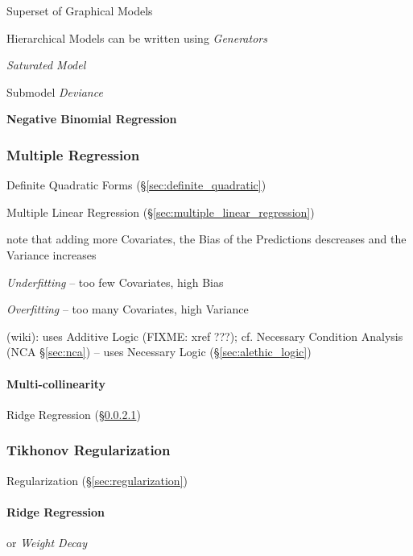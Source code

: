 Superset of Graphical Models

Hierarchical Models can be written using \emph{Generators}

\emph{Saturated Model}

Submodel \emph{Deviance}

\textbf{Negative Binomial Regression}



\subsubsection{Multiple Regression}\label{sec:multiple_regression}

Definite Quadratic Forms (\S\ref{sec:definite_quadratic})

Multiple Linear Regression (\S\ref{sec:multiple_linear_regression})

note that adding more Covariates, the Bias of the Predictions descreases and the
Variance increases

\emph{Underfitting} -- too few Covariates, high Bias

\emph{Overfitting} -- too many Covariates, high Variance

(wiki): uses Additive Logic (FIXME: xref ???); cf. Necessary Condition Analysis
(NCA \S\ref{sec:nca}) -- uses Necessary Logic (\S\ref{sec:alethic_logic})



\paragraph{Multi-collinearity}\label{sec:multicollinearity}\hfill

Ridge Regression (\S\ref{sec:ridge_regression})



\subsubsection{Tikhonov Regularization}\label{sec:tikhonov_regularization}\hfill

Regularization (\S\ref{sec:regularization})



\paragraph{Ridge Regression}\label{sec:ridge_regression}\hfill

or \emph{Weight Decay}

